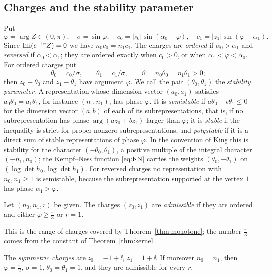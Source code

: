 \subsection{Charges and the stability parameter}
Put
\[
 \varphi=\arg Z\in(0,\pi),\quad\sigma=\sin\varphi,\quad
 c_0=|z_0|\sin(\alpha_0-\varphi),\quad c_1=|z_1|\sin(\varphi-\alpha_1).
\]
Since $\operatorname{Im}(e^{-\mathrm i\varphi}Z)=0$ we have $n_0c_0=n_1c_1$. The charges are
\emph{ordered} if $\alpha_0>\alpha_1$ and \emph{reversed} if
$\alpha_0<\alpha_1$; they are ordered exactly when $c_0>0$, or when
$\alpha_1<\varphi<\alpha_0$. For ordered charges put
\begin{equation}\label{eq:theta}
 \theta_0=c_0/\sigma,\qquad\theta_1=c_1/\sigma,\qquad
 \vartheta=n_0\theta_0=n_1\theta_1>0 ;
\end{equation}
then $z_0+\theta_0$ and $z_1-\theta_1$ have argument $\varphi$. We call the
pair $(\theta_0,\theta_1)$ the \emph{stability parameter}. A
representation whose dimension vector $(a_0,a_1)$ satisfies
$a_0\theta_0=a_1\theta_1$, for instance $(n_0,n_1)$, has phase $\varphi$. It
is \emph{semistable} if $a\theta_0-b\theta_1\leq0$ for the dimension vector
$(a,b)$ of each of its subrepresentations, that is, if no subrepresentation
has phase $\arg(az_0+bz_1)$ larger than $\varphi$; it is \emph{stable} if the
inequality is strict for proper nonzero subrepresentations, and
\emph{polystable} if it is a direct sum of stable representations of phase
$\varphi$. In the convention of King \cite[Definition~1.1]{kin94} this is
stability for the character $(-\theta_0,\theta_1)$, a positive multiple of
the integral character $(-n_1,n_0)$; the Kempf--Ness function \eqref{eq:KN}
carries the weights $(\theta_0,-\theta_1)$ on
$(\log\det h_0,\log\det h_1)$. For reversed charges no
representation with $n_0,n_1\geq1$ is semistable, because the
subrepresentation supported at the vertex $1$ has phase
$\alpha_1>\varphi$.

\begin{definition}\label{def:admissible}
Let $(n_0,n_1,r)$ be given. The charges $(z_0,z_1)$ are
\emph{admissible} if they are ordered and either $\varphi\geq\frac\pi3$ or
$r=1$.
\end{definition}

This is the range of charges covered by Theorem~\ref{thm:monotone}; the
number $\frac\pi3$ comes from the constant of Theorem~\ref{thm:kernel}.

The \emph{symmetric charges} are $z_0=-1+\ii$, $z_1=1+\ii$. If moreover
$n_0=n_1$, then $\varphi=\frac\pi2$, $\sigma=1$, $\theta_0=\theta_1=1$, and they
are admissible for every $r$.

